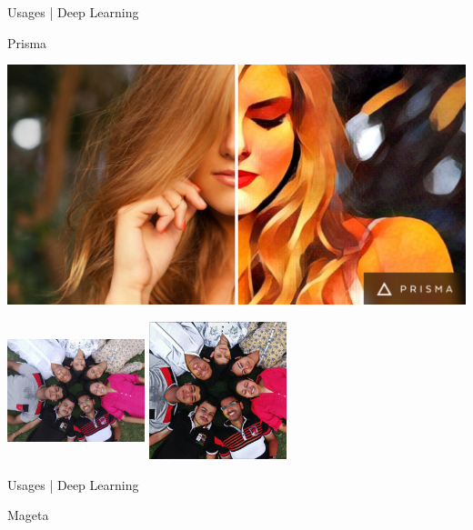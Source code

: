 \documentclass[10pt]{beamer}
\begin{document}
						\begin{frame}{Usages | Deep Learning}
\begin{center}
				
					 
Prisma

  \includegraphics[scale=0.05 ]{images/somnath_13}

  \includegraphics[width=40mm,height=40mm ]{images/somnath_14}  \includegraphics[width=40mm,height=40mm  ]{images/somnath_15}

				
				\end{center}
			\end{frame}
						\begin{frame}{Usages | Deep Learning}
\begin{center}
				
					 
 Mageta



				
				\end{center}
			\end{frame}
	
\end{document}
